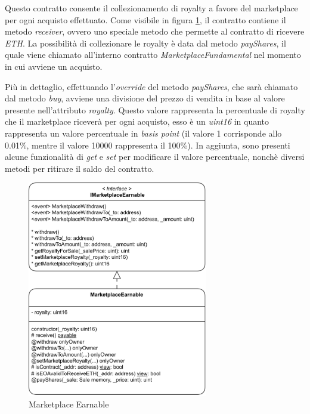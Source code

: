 Questo contratto consente il collezionamento di royalty a favore del marketplace per ogni acquisto effettuato. Come visibile in figura \ref{fig:marketplaceEarnable}, il contratto contiene il metodo \textit{receiver}, ovvero uno speciale metodo che permette al contratto di ricevere \textit{ETH}. La possibilità di collezionare le royalty è data dal metodo \textit{payShares}, il quale viene chiamato all'interno contratto \textit{MarketplaceFundamental}  nel momento in cui avviene un acquisto. 

Più in dettaglio, effettuando l'\textit{override} del metodo \textit{payShares}, che sarà chiamato dal metodo \textit{buy}, avviene una divisione del prezzo di vendita in base al valore presente nell'attributo \textit{royalty}. Questo valore rappresenta la percentuale di royalty che il marketplace riceverà per ogni acquisto, esso è un \textit{uint16} in quanto rappresenta un valore percentuale in \textit{basis point} (il valore 1 corrisponde allo 0.01\%, mentre il valore 10000 rappresenta il 100\%). In aggiunta, sono presenti alcune funzionalità di \textit{get} e \textit{set} per modificare il valore percentuale, nonchè diversi metodi per ritirare il saldo del contratto. 

\begin{figure}[H]
    \centering
    \includegraphics[width=0.7\textwidth]{images/blockchainContracts/MarketplaceEarnable.png}
    \caption{Marketplace Earnable}
    \label{fig:marketplaceEarnable}
\end{figure}

